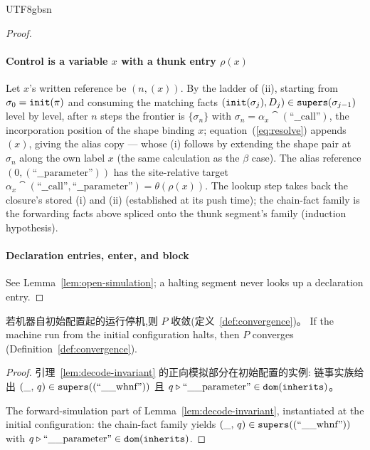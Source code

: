 \begin{CJK*}{UTF8}{gbsn}
\begin{proof}
  \paragraph{Control is a variable $x$ with a thunk entry $\rho(x)$}
  Let $x$'s written reference be $(n, (x))$. By the ladder of (ii),
  starting from $\sigma_0 = \mathtt{init}(\pi)$ and consuming the matching
  facts $(\mathtt{init}(\sigma_j), D_j) \in \mathtt{supers}(\sigma_{j-1})$ level by
  level, after $n$ steps the frontier is $\{\sigma_n\}$ with
  $\sigma_n = \alpha_x \cat (\text{``\_\_call''})$, the incorporation
  position of the shape binding $x$; equation~(\ref{eq:resolve})
  appends $(x)$, giving the alias copy --- whose (i) follows by
  extending the shape pair at $\sigma_n$ along the own label $x$
  (the same calculation as the $\beta$ case). The alias reference
  $(0, (\text{``\_\_parameter''}))$ has the site-relative target
  $\alpha_x \cat (\text{``\_\_call''}, \text{``\_\_parameter''}) =
  \theta(\rho(x))$. The lookup step takes back the closure's stored
  (i) and (ii) (established at its push time); the chain-fact family
  is the forwarding facts above spliced onto the thunk segment's
  family (induction hypothesis).

  \paragraph{Declaration entries, enter, and block}
  See Lemma~\ref{lem:open-simulation}; a halting segment never looks
  up a declaration entry.
\fi
\end{proof}

\begin{lemma}\label{lem:sim-forward}
  \ifPaperChinese
  若机器自初始配置起的运行停机,则 $P$ 收敛(定义~\ref{def:convergence})。
  \else
  If the machine run from the initial configuration halts, then $P$
  converges (Definition~\ref{def:convergence}).
  \fi
\end{lemma}

\begin{proof}
\ifPaperChinese
  \begin{sloppypar}
  引理~\ref{lem:decode-invariant} 的正向模拟部分在初始配置的实例:
  链事实族给出 $(\_,\, q) \in \mathtt{supers}((\text{``\_\_whnf''}))$ 且
  $q \mathbin{\triangleright} \text{``\_\_parameter''} \in \mathtt{dom}(\mathtt{inherits})$。
  \end{sloppypar}
\else
  The forward-simulation part of Lemma~\ref{lem:decode-invariant},
  instantiated at the initial configuration: the chain-fact family
  yields $(\_,\, q) \in \mathtt{supers}((\text{``\_\_whnf''}))$ with
  $q \mathbin{\triangleright} \text{``\_\_parameter''} \in \mathtt{dom}(\mathtt{inherits})$.
\fi
\end{proof}


\end{CJK*}
